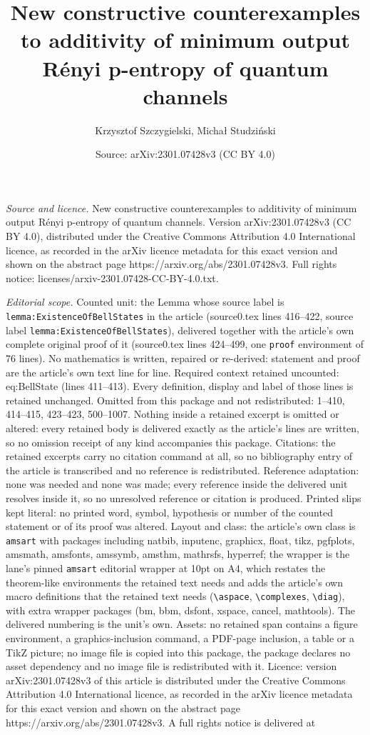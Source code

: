 \documentclass[10pt,a4paper]{amsart}
\title[New constructive counterexamples to additivity of minimum ou]{New constructive counterexamples to additivity of minimum output R\'enyi p-entropy of quantum channels}
\author{Krzysztof Szczygielski, Micha{\l} Studzi\'nski}
\date{Source: arXiv:2301.07428v3 (CC BY 4.0)}
\begin{document}
\maketitle

\noindent\emph{Source and licence.} New constructive counterexamples to additivity of minimum output R\'enyi p-entropy of quantum channels. Version arXiv:2301.07428v3 (CC BY 4.0), distributed under the Creative Commons Attribution 4.0 International licence, as recorded in the arXiv licence metadata for this exact version and shown on the abstract page https://arxiv.org/abs/2301.07428v3. Full rights notice: licenses/arxiv-2301.07428-CC-BY-4.0.txt.\par\smallskip

\noindent\textit{Editorial scope.} Counted unit: the Lemma whose source label is \texttt{lemma:ExistenceOfBellStates} in the article (source0.tex lines 416--422, source label \texttt{lemma:ExistenceOfBellStates}), delivered together with the article's own complete original proof of it (source0.tex lines 424--499, one \texttt{proof} environment of 76 lines). No mathematics is written, repaired or re-derived: statement and proof are the article's own text line for line. Required context retained uncounted: eq:BellState (lines 411--413). Every definition, display and label of those lines is retained unchanged. Omitted from this package and not redistributed: 1--410, 414--415, 423--423, 500--1007. Nothing inside a retained excerpt is omitted or altered: every retained body is delivered exactly as the article's lines are written, so no omission receipt of any kind accompanies this package. Citations: the retained excerpts carry no citation command at all, so no bibliography entry of the article is transcribed and no reference is redistributed. Reference adaptation: none was needed and none was made; every reference inside the delivered unit resolves inside it, so no unresolved reference or citation is produced. Printed slips kept literal: no printed word, symbol, hypothesis or number of the counted statement or of its proof was altered. Layout and class: the article's own class is \texttt{amsart} with packages including natbib, inputenc, graphicx, float, tikz, pgfplots, amsmath, amsfonts, amssymb, amsthm, mathrsfs, hyperref; the wrapper is the lane's pinned \texttt{amsart} editorial wrapper at 10pt on A4, which restates the theorem-like environments the retained text needs and adds the article's own macro definitions that the retained text needs (\texttt{\textbackslash aspace}, \texttt{\textbackslash complexes}, \texttt{\textbackslash diag}), with extra wrapper packages (bm, bbm, dsfont, xspace, cancel, mathtools). The delivered numbering is the unit's own. Assets: no retained span contains a figure environment, a graphics-inclusion command, a PDF-page inclusion, a table or a TikZ picture; no image file is copied into this package, the package declares no asset dependency and no image file is redistributed with it. Licence: version arXiv:2301.07428v3 of this article is distributed under the Creative Commons Attribution 4.0 International licence, as recorded in the arXiv licence metadata for this exact version and shown on the abstract page https://arxiv.org/abs/2301.07428v3. A full rights notice is delivered at 
\end{document}
